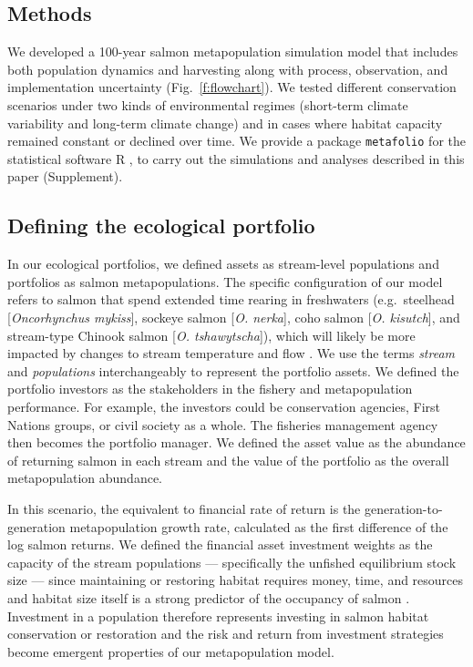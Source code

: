\documentclass[12pt,english]{article}
\newcommand{\somR}{Supplement}
\begin{document}
\begin{spacing}{1.3}
\section{Methods}\label{methods}

We developed a 100-year salmon metapopulation simulation model that includes both population dynamics and harvesting along with process, observation, and implementation uncertainty (Fig.~\ref{f:flowchart}). We tested different conservation scenarios under two kinds of environmental regimes (short-term climate variability and long-term climate change) and in cases where habitat capacity remained constant or declined over time. We provide a package \texttt{metafolio} \citep{metafoliopkg} for the statistical software \textsf{R} \citep{r2013}, to carry out the simulations and analyses described in this paper (\somR).

\subsection{Defining the ecological portfolio}\label{defining-the-ecological-portfolio}

In our ecological portfolios, we defined assets as stream-level populations and portfolios as salmon metapopulations. The specific configuration of our model refers to salmon that spend extended time rearing in freshwaters (e.g.~steelhead {[}\emph{Oncorhynchus mykiss}{]}, sockeye salmon {[}\emph{O. nerka}{]}, coho salmon {[}\emph{O. kisutch}{]}, and stream-type Chinook salmon {[}\emph{O. tshawytscha}{]}), which will likely be more impacted by changes to stream temperature and flow \citep{mantua2010}. We use the terms \emph{stream} and \emph{populations} interchangeably to represent the portfolio assets. We defined the portfolio investors as the stakeholders in the fishery and metapopulation performance. For example, the investors could be conservation agencies, First Nations groups, or civil society as a whole. The fisheries management agency then becomes the portfolio manager. We defined the asset value as the abundance of returning salmon in each stream and the value of the portfolio as the overall metapopulation abundance.

In this scenario, the equivalent to financial rate of return is the generation-to-generation metapopulation growth rate, calculated as the first difference of the log salmon returns. We defined the financial asset investment weights as the capacity of the stream populations --- specifically the unfished equilibrium stock size --- since maintaining or restoring habitat requires money, time, and resources and habitat size itself is a strong predictor of the occupancy of salmon \citep{isaak2007}. Investment in a population therefore represents investing in salmon habitat conservation or restoration and the risk and return from investment strategies become emergent properties of our metapopulation model.


\end{spacing}
\end{document}
